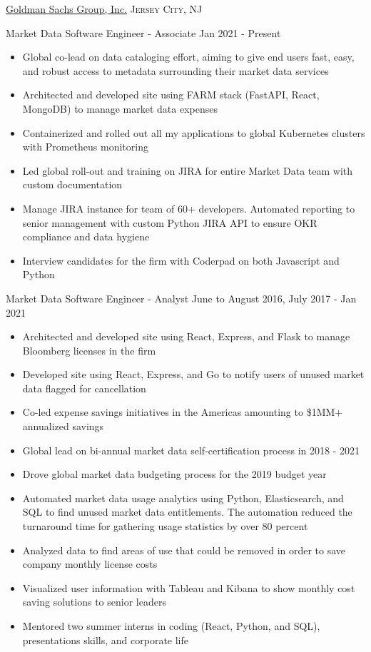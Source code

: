 \documentclass[10pt,letterpaper]{article}
\begin{document}
\headedsection
  {\href{http://www.goldmansachs.com/}{Goldman Sachs Group, Inc.}}
  {\textsc{Jersey City, NJ}} {
  \headedsubsection
    {Market Data Software Engineer - Associate}
    {Jan 2021 - Present}
    {\begin{itemize}
    \item Global co-lead on data cataloging effort, aiming to give end users fast, easy, and robust access to metadata surrounding their market data services
    \item Architected and developed site using FARM stack (FastAPI, React, MongoDB) to manage market data expenses
    \item Containerized and rolled out all my applications to global Kubernetes clusters with Prometheus monitoring
    \item Led global roll-out and training on JIRA for entire Market Data team with custom documentation
    \item Manage JIRA instance for team of 60+ developers. Automated reporting to senior management with custom Python JIRA API to ensure OKR compliance and data hygiene
    \item Interview candidates for the firm with Coderpad on both Javascript and Python
    \end{itemize}}
  \headedsubsection
    {Market Data Software Engineer - Analyst}
    {June to August 2016, July 2017 - Jan 2021}
    {\begin{itemize}
    \item Architected and developed site using React, Express, and Flask to manage Bloomberg licenses in the firm
    \item Developed site using React, Express, and Go to notify users of unused market data flagged for cancellation
    \item Co-led expense savings initiatives in the Americas amounting to \$1MM+ annualized savings
    \item Global lead on bi-annual market data self-certification process in 2018 - 2021
    \item Drove global market data budgeting process for the 2019 budget year
    \item Automated market data usage analytics using Python, Elasticsearch, and SQL to find unused market data entitlements. The automation reduced the turnaround time for gathering usage statistics by over 80 percent
    \item Analyzed data to find areas of use that could be removed in order to save company monthly license costs
    \item Visualized user information with Tableau and Kibana to show monthly cost saving solutions to senior leaders
    \item Mentored two summer interns in coding (React, Python, and SQL), presentations skills, and corporate life
    \end{itemize}}
}
\end{document}
